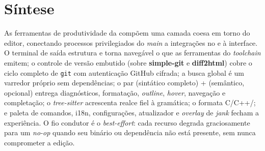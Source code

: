 \section{Síntese}
\label{sec:13-sintese}

As ferramentas de produtividade da  compõem uma camada coesa em
torno do editor, conectando processos privilegiados do \textit{main} a
integrações no  e à interface. O terminal de saída estrutura e
torna navegável o que as ferramentas do \textit{toolchain} emitem; o controle de
versão embutido (sobre \textbf{simple-git} e \textbf{diff2html}) cobre o ciclo
completo de \lstinline|git| com autenticação GitHub cifrada; a busca global é um
varredor próprio sem dependências; o par  (sintático completo) +
 (semântico, opcional) entrega diagnósticos, formatação,
\textit{outline}, \textit{hover}, navegação e completação; o
\textit{tree-sitter} acrescenta realce fiel à gramática; o 
formata C/C++/\cmm; e paleta de comandos, i18n, configurações, atualizador e
\textit{overlay} de \textit{jank} fecham a experiência. O fio condutor é o
\textit{best-effort}: cada recurso degrada graciosamente para um \textit{no-op}
quando seu binário ou dependência não está presente, sem nunca comprometer a
edição.
